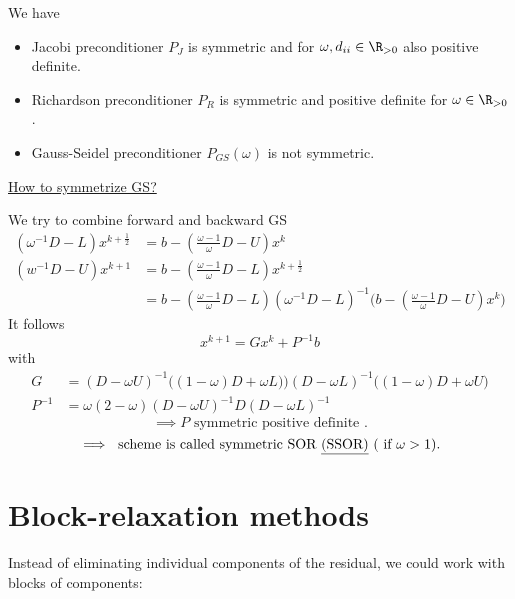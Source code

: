 We have
\begin{itemize}
	\item Jacobi preconditioner $P_{J}$ is symmetric and for $\omega , d_{ii} \in \R_{>0}$ also positive definite.
	\item Richardson preconditioner $P_{R}$ is symmetric and positive definite for $\omega \in \R_{>0}$.
	\item Gauss-Seidel preconditioner $P_{GS}(\omega )$ is not symmetric.
\end{itemize}

\underline{How to symmetrize GS?} 

We try to combine forward and backward GS
	\begin{align*}
		(\omega ^{-1}D-L) x^{k+\frac{1}{2}} &= b -\left( \frac{\omega -1}{\omega }D-U \right) x^{k} \\
		(w^{-1}D-U) x^{k+1} &= b- \left( \frac{\omega -1}{\omega }D-L \right) x^{k+\frac{1}{2}} \\
							&= b - \left( \frac{\omega -1}{\omega }D-L \right) (\omega ^{-1}D-L)^{-1}\Big(b-\left(\frac{\omega -1}{\omega }D-U\right)x^{k}\Big)
	\end{align*}
	It follows
	\[
	x^{k+1}=Gx^{k} + P^{-1}b
	\] 
	with
	\begin{align*}
		G &= (D-\omega U)^{-1} \Big( (1-\omega )D+\omega L)\Big)(D-\omega L)^{-1} \Big( (1-\omega ) D + \omega U \Big) \\
		P^{-1}&= \omega (2-\omega )(D-\omega U)^{-1}D (D-\omega L)^{-1}
	\end{align*}
	\[
\implies P \text{ symmetric positive definite }	
	.\] 
	\[
		\implies \text{ scheme is called symmetric SOR \underline{(SSOR)} } (\text{ if } \omega > 1)
	.\] 

\section{Block-relaxation methods}%
\label{sec:Block-relaxation methods}

Instead of eliminating individual components of the residual, we could work with blocks of components:

